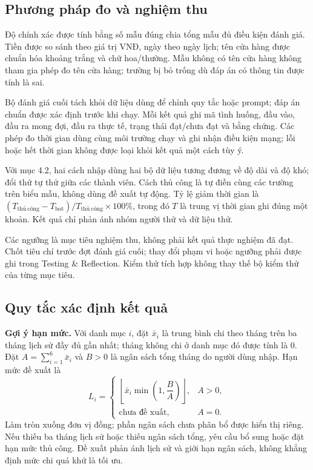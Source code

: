 \documentclass[11pt,a4paper]{article}
\begin{document}
\subsection{Phương pháp đo và nghiệm thu}
Độ chính xác được tính bằng số mẫu đúng chia tổng mẫu đủ điều kiện đánh giá. Tiền được so sánh theo giá trị VNĐ, ngày theo ngày lịch; tên cửa hàng được chuẩn hóa khoảng trắng và chữ hoa/thường. Mẫu không có tên cửa hàng không tham gia phép đo tên cửa hàng; trường bị bỏ trống dù đáp án có thông tin được tính là sai.

Bộ đánh giá cuối tách khỏi dữ liệu dùng để chỉnh quy tắc hoặc prompt; đáp án chuẩn được xác định trước khi chạy. Mỗi kết quả ghi mã tình huống, đầu vào, đầu ra mong đợi, đầu ra thực tế, trạng thái đạt/chưa đạt và bằng chứng. Các phép đo thời gian dùng cùng môi trường chạy và ghi nhận điều kiện mạng; lỗi hoặc hết thời gian không được loại khỏi kết quả một cách tùy ý.

Với mục 4.2, hai cách nhập dùng hai bộ dữ liệu tương đương về độ dài và độ khó; đổi thứ tự thử giữa các thành viên. Cách thủ công là tự điền cùng các trường trên biểu mẫu, không dùng đề xuất tự động. Tỷ lệ giảm thời gian là $(T_{\mathrm{thủ\ công}}-T_{\mathrm{bot}})/T_{\mathrm{thủ\ công}}\times100\%$, trong đó $T$ là trung vị thời gian ghi đúng một khoản. Kết quả chỉ phản ánh nhóm người thử và dữ liệu thử.

Các ngưỡng là mục tiêu nghiệm thu, không phải kết quả thực nghiệm đã đạt. Chốt tiêu chí trước đợt đánh giá cuối; thay đổi phạm vi hoặc ngưỡng phải được ghi trong Testing \& Reflection. Kiểm thử tích hợp không thay thế bộ kiểm thử của từng mục tiêu.

\subsection{Quy tắc xác định kết quả}
\textbf{Gợi ý hạn mức.} Với danh mục $i$, đặt $\bar{x}_i$ là trung bình chi theo tháng trên ba tháng lịch sử đầy đủ gần nhất; tháng không chi ở danh mục đó được tính là 0. Đặt $A=\sum_{i=1}^{6}\bar{x}_i$ và $B>0$ là ngân sách tổng tháng do người dùng nhập. Hạn mức đề xuất là
\[
L_i=\begin{cases}
\left\lfloor\bar{x}_i\min\left(1,\dfrac{B}{A}\right)\right\rfloor,& A>0,\\
\text{chưa đề xuất},& A=0.
\end{cases}
\]
Làm tròn xuống đơn vị đồng; phần ngân sách chưa phân bổ được hiển thị riêng. Nếu thiếu ba tháng lịch sử hoặc thiếu ngân sách tổng, yêu cầu bổ sung hoặc đặt hạn mức thủ công. Đề xuất phản ánh lịch sử và giới hạn ngân sách, không khẳng định mức chi quá khứ là tối ưu.
\end{document}
